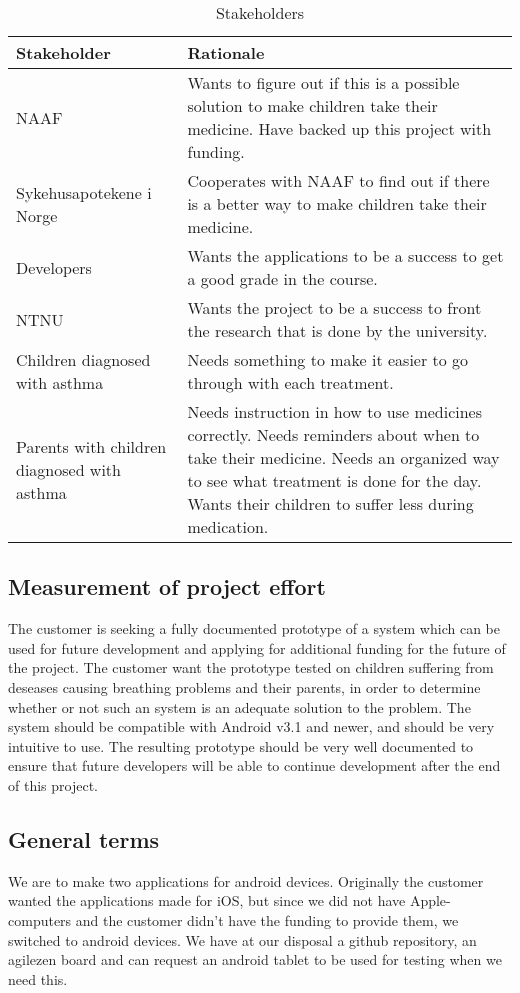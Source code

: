 \begin{table}[h]
	\begin{tabular}{|p{4cm}|p{7cm}|}   
		\hline      
		
		\bf{Stakeholder} & \bf{Rationale} \\ 
		\hline
		NAAF & Wants to figure out if this is a possible solution to make children take
		their medicine. Have backed up this project with funding. 
		\\
		\hline
		Sykehusapotekene i Norge & Cooperates with NAAF to find out if there is a better
		way to make children take their medicine. 
		\\
		\hline
		Developers & Wants the applications to be a success to get a good grade in the
		course.
		\\
		\hline
		NTNU & Wants the project to be a success to front the research that is done by
		the university.
		\\
		\hline
		Children diagnosed with asthma & Needs something to make it easier to go through
		with each treatment.
		\\
		\hline
		Parents with children diagnosed with asthma & Needs instruction in how to use
		medicines correctly. Needs reminders about when to take their medicine. Needs an
		organized way to see what treatment is done for the day. Wants their children to
		suffer less during medication.
		\\
		\hline
	\end{tabular}
	\caption{Stakeholders}
	\label{tab:stakeholders}
\end{table}


\subsection{Measurement of project effort}
The customer is seeking a fully documented prototype of a system which can be used for future 
development and applying for additional funding for the future of the project. The customer want
the prototype tested on children suffering from deseases causing breathing problems and their parents, in order
to determine whether or not such an system is an adequate solution to the problem. The system should be
compatible with Android v3.1 and newer, and should be very intuitive to use. The resulting prototype should be very well documented
to ensure that future developers will be able to continue development after the end of this project.

  
\subsection{General terms}
We are to make two applications for android devices. Originally the customer wanted the applications made for iOS, 
but since we did not have Apple-computers and the customer didn't have the funding to provide them, we 
switched to android devices. We have at our disposal a github repository, an agilezen board and can request 
an android tablet to be used for testing when we need this.


